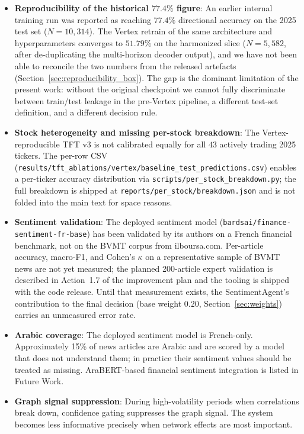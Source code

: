 \documentclass[conference]{IEEEtran}
\begin{document}
\begin{itemize}
\item \textbf{Reproducibility of the historical $77.4\%$ figure}: An earlier internal training run was reported as reaching $77.4\%$ directional accuracy on the 2025 test set ($N=10{,}314$). The Vertex retrain of the same architecture and hyperparameters converges to $51.79\%$ on the harmonized slice ($N=5{,}582$, after de-duplicating the multi-horizon decoder output), and we have not been able to reconcile the two numbers from the released artefacts (Section~\ref{sec:reproducibility_box}). The gap is the dominant limitation of the present work: without the original checkpoint we cannot fully discriminate between train/test leakage in the pre-Vertex pipeline, a different test-set definition, and a different decision rule.

\item \textbf{Stock heterogeneity and missing per-stock breakdown}: The Vertex-reproducible TFT v3 is not calibrated equally for all $43$ actively trading 2025 tickers. The per-row CSV (\texttt{results/tft\_ablations/vertex/baseline\_test\_predictions.csv}) enables a per-ticker accuracy distribution via \texttt{scripts/per\_stock\_breakdown.py}; the full breakdown is shipped at \texttt{reports/per\_stock/breakdown.json} and is not folded into the main text for space reasons.

\item \textbf{Sentiment validation}: The deployed sentiment model (\texttt{bardsai/finance-sentiment-fr-base}) has been validated by its authors on a French financial benchmark, not on the BVMT corpus from ilboursa.com. Per-article accuracy, macro-F1, and Cohen's $\kappa$ on a representative sample of BVMT news are not yet measured; the planned 200-article expert validation is described in Action~1.7 of the improvement plan and the tooling is shipped with the code release. Until that measurement exists, the SentimentAgent's contribution to the final decision (base weight $0.20$, Section~\ref{sec:weights}) carries an unmeasured error rate.

\item \textbf{Arabic coverage}: The deployed sentiment model is French-only. Approximately 15\% of news articles are Arabic and are scored by a model that does not understand them; in practice their sentiment values should be treated as missing. AraBERT-based financial sentiment integration is listed in Future Work.

\item \textbf{Graph signal suppression}: During high-volatility periods when correlations break down, confidence gating suppresses the graph signal. The system becomes less informative precisely when network effects are most important.


\end{itemize}
\end{document}
